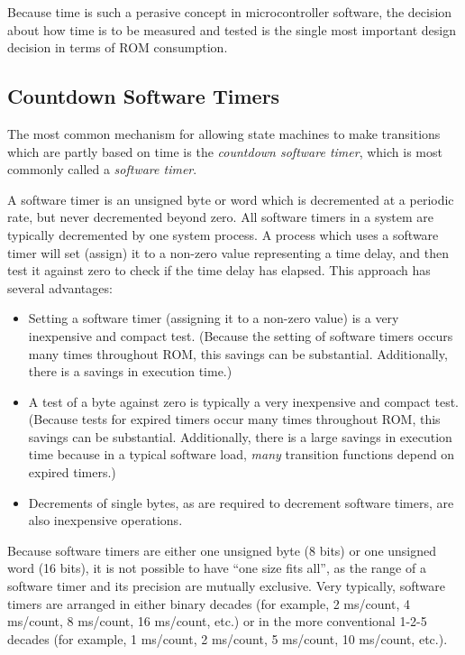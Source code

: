 Because time is such a perasive concept in microcontroller software,
the decision about how time is to be measured and tested is the
single most important design decision in terms of ROM consumption.


\subsection{Countdown Software Timers}
\label{cpco0:smot0:scst0}

The most common mechanism for allowing state machines to make transitions
which are partly based on time is the 
\emph{countdown software timer},
which is most commonly called a 
\emph{software timer}.

A software timer is an unsigned byte or word which is decremented at a 
periodic rate, but never decremented beyond zero.  All software 
timers in a system are typically decremented by one system process.
A process which uses a software timer will set (assign) it to
a non-zero value representing a time delay, and then test it against 
zero to check if the time delay has elapsed.  This approach has
several advantages:

\begin{itemize}
\item Setting a software timer (assigning it to a non-zero
      value) is a very inexpensive and compact test.  (Because
      the setting of software timers occurs many times throughout
      ROM, this savings can be substantial.  Additionally,
      there is a savings in execution time.)
\item A test of a byte against zero is typically a very 
      inexpensive and compact test.  (Because tests for
      expired timers occur many times throughout ROM,
      this savings can be substantial.  Additionally, there
      is a large savings in execution time because 
      in a typical software load, \emph{many} transition
      functions depend on expired timers.)
\item Decrements of single bytes, as are required
      to decrement software timers, are also inexpensive operations.
\end{itemize}

Because software timers are either one unsigned byte (8 bits) or
one unsigned word (16 bits), it is not possible to have ``one size
fits all'', as the range of a software timer and its precision
are mutually exclusive.  Very typically, software timers are arranged 
in either binary decades (for example, 2 ms/count, 4 ms/count, 
8 ms/count, 16 ms/count, etc.) or in the more conventional
1-2-5 decades (for example, 1 ms/count, 2 ms/count, 5 ms/count,
10 ms/count, etc.).

